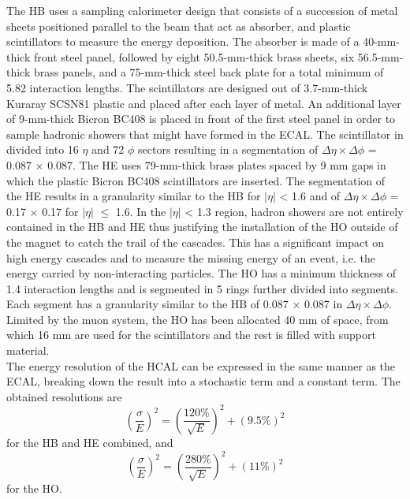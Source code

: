     The HB uses a sampling calorimeter design that consists of a succession of metal sheets positioned parallel to the beam that act as absorber, and plastic scintillators to measure the energy deposition. The absorber is made of a 40-mm-thick front steel panel, followed by eight 50.5-mm-thick brass sheets, six 56.5-mm-thick brass panels, and a 75-mm-thick steel back plate for a total minimum of 5.82 interaction lengths. The scintillators are designed out of 3.7-mm-thick Kuraray SCSN81 plastic and placed after each layer of metal. An additional layer of 9-mm-thick Bicron BC408 is placed in front of the first steel panel in order to sample hadronic showers that might have formed in the ECAL. The scintillator in divided into 16 $ \eta $ and 72 $ \phi $ sectors resulting in a segmentation of $ \Delta \eta \times \Delta \phi $ = 0.087 $ \times $ 0.087. The HE uses 79-mm-thick brass plates spaced by 9 mm gaps in which the plastic Bicron BC408 scintillators are inserted. The segmentation of the HE results in a granularity similar to the HB for $ | \eta | $ < 1.6 and of $ \Delta \eta \times \Delta \phi $ = 0.17 $ \times $ 0.17 for $ | \eta | $ $ \le $ 1.6. In the $ | \eta | $ < 1.3 region, hadron showers are not entirely contained in the HB and HE thus justifying the installation of the HO outside of the magnet to catch the trail of the cascades. This has a significant impact on high energy cascades and to measure the missing energy of an event, i.e. the energy carried by non-interacting particles. The HO has a minimum thickness of 1.4 interaction lengths and is segmented in 5 rings further divided into segments. Each segment has a granularity similar to the HB of 0.087 $ \times $ 0.087 in $ \Delta \eta \times \Delta \phi $. Limited by the muon system, the HO has been allocated 40 mm of space, from which 16 mm are used for the scintillators and the rest is filled with support material. \\

    The energy resolution of the HCAL can be expressed in the same manner as the ECAL, breaking down the result into a stochastic term and a constant term. The obtained resolutions \cite{Baiatian:1049929} are
    \begin{equation}
      \left( \frac{\sigma}{E} \right)^2 = \left( \frac{120\%}{\sqrt{E}} \right)^2 + (9.5\%)^2
    \end{equation}
    for the HB and HE combined, and
    \begin{equation}
      \left( \frac{\sigma}{E} \right)^2 = \left( \frac{280\%}{\sqrt{E}} \right)^2 + (11\%)^2
    \end{equation}
    for the HO.

